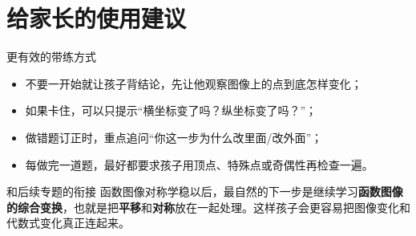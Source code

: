 \documentclass[11pt,a4paper,fontset=fandol]{ctexart}
\begin{document}
\section{给家长的使用建议}

\begin{warnbox}{更有效的带练方式}
\begin{itemize}
  \item 不要一开始就让孩子背结论，先让他观察图像上的点到底怎样变化；
  \item 如果卡住，可以只提示“横坐标变了吗？纵坐标变了吗？”；
  \item 做错题订正时，重点追问“你这一步为什么改里面/改外面”；
  \item 每做完一道题，最好都要求孩子用顶点、特殊点或奇偶性再检查一遍。
\end{itemize}
\end{warnbox}

\begin{infobox}{和后续专题的衔接}
函数图像对称学稳以后，最自然的下一步是继续学习\textbf{函数图像的综合变换}，也就是把\textbf{平移}和\textbf{对称}放在一起处理。这样孩子会更容易把图像变化和代数式变化真正连起来。
\end{infobox}
\end{document}
